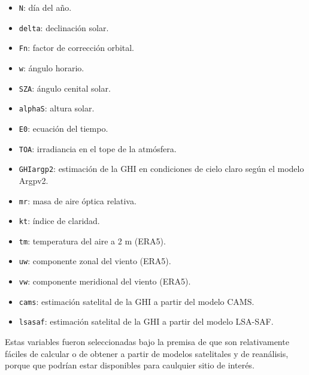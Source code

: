 \begin{itemize}
    \item \texttt{N}: día del año.
    \item \texttt{delta}: declinación solar.
    \item \texttt{Fn}: factor de corrección orbital.
    \item \texttt{w}: ángulo horario.
    \item \texttt{SZA}: ángulo cenital solar.
    \item \texttt{alphaS}: altura solar.
    \item \texttt{E0}: ecuación del tiempo.
    \item \texttt{TOA}: irradiancia en el tope de la atmósfera.
    \item \texttt{GHIargp2}: estimación de la GHI en condiciones de cielo claro según el modelo Argpv2.
    \item \texttt{mr}: masa de aire óptica relativa.
    \item \texttt{kt}: índice de claridad.
    \item \texttt{tm}: temperatura del aire a 2 m (ERA5).
    \item \texttt{uw}: componente zonal del viento (ERA5).
    \item \texttt{vw}: componente meridional del viento (ERA5).
    \item \texttt{cams}: estimación satelital de la GHI a partir del modelo CAMS.
    \item \texttt{lsasaf}: estimación satelital de la GHI a partir del modelo LSA-SAF.
\end{itemize}

Estas variables fueron seleccionadas bajo la premisa de que son relativamente fáciles de calcular o de obtener a partir de modelos satelitales y de reanálisis, porque que podrían estar disponibles para caulquier sitio de interés.\\




